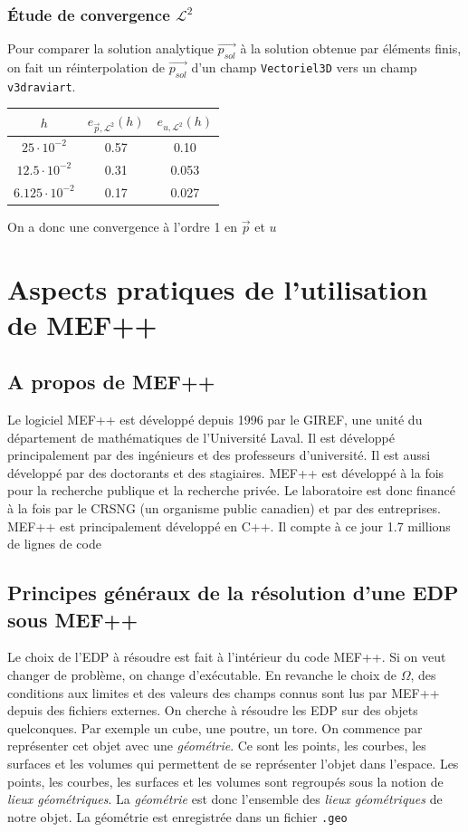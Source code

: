 \documentclass[a4paper,12pt]{article}
\begin{document}
\subsubsection{Étude de convergence $\mathcal{L}^{2}$}
Pour comparer la solution analytique $\vec{p_{sol}}$ à la solution obtenue par éléments finis, 
on fait un réinterpolation de $\vec{p_{sol}}$ d'un champ \texttt{Vectoriel3D} vers un champ \texttt{v3draviart}.
\begin{center}
\begin{tabular}{|c|c|c|}
\hline
$h$ & $e_{\vec{p},\mathcal{L}^{2}}(h)$ & $e_{u,\mathcal{L}^{2}}(h)$ \\
\hline
$25 \cdot 10^{-2}$ & 0.57 & 0.10\\
\hline
$12.5 \cdot 10^{-2}$ &  0.31 & 0.053\\
\hline
$6.125 \cdot 10^{-2}$ &  0.17 & 0.027\\
\hline
\end{tabular}
\end{center}
On a donc une convergence à l'ordre 1 en $\vec{p}$ et $u$
\newpage
\section{Aspects pratiques de l'utilisation de MEF++}
\subsection{A propos de MEF++}
Le logiciel MEF++ est développé depuis 1996 par le GIREF, une unité du département de mathématiques de l'Université Laval. 
Il est développé principalement par des ingénieurs et des professeurs d'université. 
Il est aussi développé par des doctorants et des stagiaires. MEF++ est développé à la fois pour la recherche publique et la recherche privée. 
Le laboratoire est donc financé à la fois par le CRSNG (un organisme public canadien) et par des entreprises.
\newline
\newline
MEF++ est principalement développé en C++. Il compte à ce jour 1.7 millions de lignes de code
\subsection{Principes généraux de la résolution d'une EDP sous MEF++}

Le choix de l'EDP à résoudre est fait à l'intérieur du code MEF++. Si on veut changer de problème, on change d'exécutable. 
En revanche le choix de $\Omega$, des conditions aux limites et des valeurs des champs connus sont lus par MEF++ depuis des fichiers externes.
\newline
\newline
On cherche à résoudre les EDP sur des objets quelconques. Par exemple un cube, une poutre, un tore. 
On commence par représenter cet objet avec une \emph{géométrie}. 
Ce sont les points, les courbes, les surfaces et les volumes qui permettent de se représenter l'objet dans l'espace.
Les points, les courbes, les surfaces et les volumes sont regroupés sous la notion de \emph{lieux géométriques}.
La \emph{géométrie} est donc l'ensemble des \emph{lieux géométriques} de notre objet. La géométrie est enregistrée dans un fichier \texttt{.geo}
\end{document}
